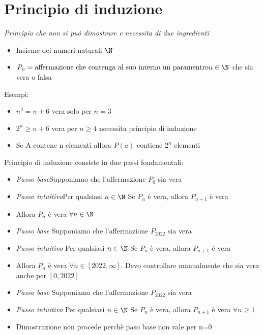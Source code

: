 \section{Principio di induzione}
\label{sec:principiodiinduzione}
\textit{Principio che non si può dimostrare e necessita di due ingredienti}
\begin{itemize}
	\item Insieme dei numeri naturali $\N$
	\item $P_n = \text{affermazione che contenga al suo interno un paramentro} n  \in \N$ che sia vera o falsa
\end{itemize}
Esempi:
\begin{itemize}
	\item $n^2= n+6$ \rarr vera solo per $n=3$
	\item $2^{n} \ge n+6$ \rarr vera per $n \ge 4$ \rarr necessita principio di induzione
	\item Se A contene n elementi allora $P\left( a \right) $ contiene $2^{n}$ elementi
\end{itemize}
Principio di induzione consiste in due passi fondamentali:
\begin{itemize}
	\item \textit{Passo base}Supponiamo che l'affermazione $P_0$ sia vera
	\item \textit{Passo intuitivo}Per qualsiasi $n  \in  \N$ Se $P_n$ è vera, allora $P_{n+1}$ è vera
	\item Allora $P_n$ è vera  $\forall n  \in  \N$
\end{itemize}
\begin{itemize}
	\item \textit{Passo base} \quad  Supponiamo che l'affermazione $P_{2022}$ sia vera
	\item \textit{Passo intuitivo} \quad Per qualsiasi $n  \in  \N$ Se $P_n$ è vera, allora $P_{n+1}$ è vera
	\item Allora $P_n$ è vera  $\forall n  \in  \left[ 2022, \infty \right] $. Devo controllare manualmente che sia vera anche per $\left[ 0, 2022 \right]$
\end{itemize}
\begin{itemize}
	\item \textit{Passo base} \quad Supponiamo che l'affermazione $P_{2022}$ sia vera
	\item \textit{Passo intuitivo} \quad Per qualsiasi $n  \in  \N$ Se $P_n$ è vera, allora $P_{n+1}$ è vera $\forall n \ge 1$
	\item Dimostrazione non procede perchè paso base non vale per n=0
\end{itemize}
%
\hr
%

